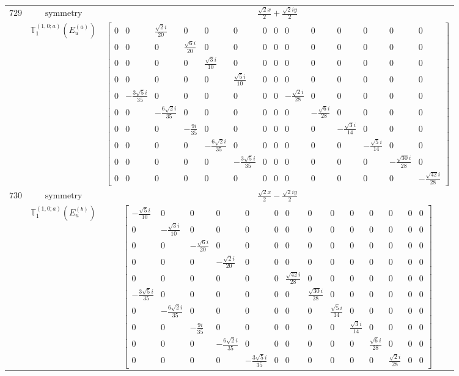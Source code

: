 \documentclass[fleqn,8pt,landscape]{jsarticle}
\begin{document}
\begin{longtable}{ccc}
$ 729 $ & $ \text{symmetry} $ & $ \frac{\sqrt{2} x}{2} + \frac{\sqrt{2} i y}{2} $ \\
$  $ & $ \mathbb{T}_{1}^{(1,0;a)}(E_{u}^{(a)}) $ & $ \begin{bmatrix} 0 & 0 & \frac{\sqrt{2} i}{20} & 0 & 0 & 0 & 0 & 0 & 0 & 0 & 0 & 0 & 0 & 0 \\ 0 & 0 & 0 & \frac{\sqrt{6} i}{20} & 0 & 0 & 0 & 0 & 0 & 0 & 0 & 0 & 0 & 0 \\ 0 & 0 & 0 & 0 & \frac{\sqrt{3} i}{10} & 0 & 0 & 0 & 0 & 0 & 0 & 0 & 0 & 0 \\ 0 & 0 & 0 & 0 & 0 & \frac{\sqrt{5} i}{10} & 0 & 0 & 0 & 0 & 0 & 0 & 0 & 0 \\ 0 & - \frac{3 \sqrt{5} i}{35} & 0 & 0 & 0 & 0 & 0 & 0 & - \frac{\sqrt{2} i}{28} & 0 & 0 & 0 & 0 & 0 \\ 0 & 0 & - \frac{6 \sqrt{2} i}{35} & 0 & 0 & 0 & 0 & 0 & 0 & - \frac{\sqrt{6} i}{28} & 0 & 0 & 0 & 0 \\ 0 & 0 & 0 & - \frac{9 i}{35} & 0 & 0 & 0 & 0 & 0 & 0 & - \frac{\sqrt{3} i}{14} & 0 & 0 & 0 \\ 0 & 0 & 0 & 0 & - \frac{6 \sqrt{2} i}{35} & 0 & 0 & 0 & 0 & 0 & 0 & - \frac{\sqrt{5} i}{14} & 0 & 0 \\ 0 & 0 & 0 & 0 & 0 & - \frac{3 \sqrt{5} i}{35} & 0 & 0 & 0 & 0 & 0 & 0 & - \frac{\sqrt{30} i}{28} & 0 \\ 0 & 0 & 0 & 0 & 0 & 0 & 0 & 0 & 0 & 0 & 0 & 0 & 0 & - \frac{\sqrt{42} i}{28} \end{bmatrix} $ \\ \hline
$ 730 $ & $ \text{symmetry} $ & $ \frac{\sqrt{2} x}{2} - \frac{\sqrt{2} i y}{2} $ \\
$  $ & $ \mathbb{T}_{1}^{(1,0;a)}(E_{u}^{(b)}) $ & $ \begin{bmatrix} - \frac{\sqrt{5} i}{10} & 0 & 0 & 0 & 0 & 0 & 0 & 0 & 0 & 0 & 0 & 0 & 0 & 0 \\ 0 & - \frac{\sqrt{3} i}{10} & 0 & 0 & 0 & 0 & 0 & 0 & 0 & 0 & 0 & 0 & 0 & 0 \\ 0 & 0 & - \frac{\sqrt{6} i}{20} & 0 & 0 & 0 & 0 & 0 & 0 & 0 & 0 & 0 & 0 & 0 \\ 0 & 0 & 0 & - \frac{\sqrt{2} i}{20} & 0 & 0 & 0 & 0 & 0 & 0 & 0 & 0 & 0 & 0 \\ 0 & 0 & 0 & 0 & 0 & 0 & \frac{\sqrt{42} i}{28} & 0 & 0 & 0 & 0 & 0 & 0 & 0 \\ - \frac{3 \sqrt{5} i}{35} & 0 & 0 & 0 & 0 & 0 & 0 & \frac{\sqrt{30} i}{28} & 0 & 0 & 0 & 0 & 0 & 0 \\ 0 & - \frac{6 \sqrt{2} i}{35} & 0 & 0 & 0 & 0 & 0 & 0 & \frac{\sqrt{5} i}{14} & 0 & 0 & 0 & 0 & 0 \\ 0 & 0 & - \frac{9 i}{35} & 0 & 0 & 0 & 0 & 0 & 0 & \frac{\sqrt{3} i}{14} & 0 & 0 & 0 & 0 \\ 0 & 0 & 0 & - \frac{6 \sqrt{2} i}{35} & 0 & 0 & 0 & 0 & 0 & 0 & \frac{\sqrt{6} i}{28} & 0 & 0 & 0 \\ 0 & 0 & 0 & 0 & - \frac{3 \sqrt{5} i}{35} & 0 & 0 & 0 & 0 & 0 & 0 & \frac{\sqrt{2} i}{28} & 0 & 0 \end{bmatrix} $ \\ \hline

\end{longtable}
\end{document}
